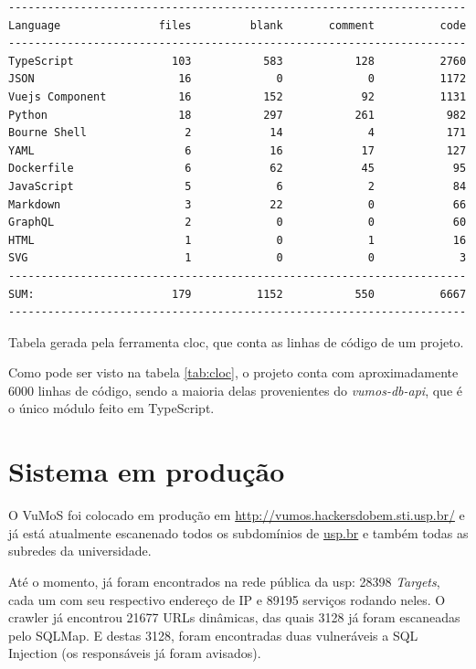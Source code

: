     \clearpage
    \begin{table}[H]
        \begin{verbatim}
----------------------------------------------------------------------
Language               files         blank       comment          code
----------------------------------------------------------------------
TypeScript               103           583           128          2760
JSON                      16             0             0          1172
Vuejs Component           16           152            92          1131
Python                    18           297           261           982
Bourne Shell               2            14             4           171
YAML                       6            16            17           127
Dockerfile                 6            62            45            95
JavaScript                 5             6             2            84
Markdown                   3            22             0            66
GraphQL                    2             0             0            60
HTML                       1             0             1            16
SVG                        1             0             0             3
----------------------------------------------------------------------
SUM:                     179          1152           550          6667
----------------------------------------------------------------------
        \end{verbatim}
        \caption{Tabela gerada pela ferramenta cloc\footnotemark, que conta as linhas de código de um projeto.}
        \label{tab:cloc}
    \end{table}
    
    
    Como pode ser visto na tabela \ref{tab:cloc}, o projeto conta com aproximadamente 6000 linhas de código, sendo a maioria delas provenientes do \textit{vumos-db-api}, que é o único módulo feito em TypeScript.

\section{Sistema em produção}
    O VuMoS foi colocado em produção em \url{http://vumos.hackersdobem.sti.usp.br/} e já está atualmente escanenado todos os subdomínios de \url{usp.br} e também todas as subredes da universidade. 
    
    Até o momento, já foram encontrados na rede pública da usp: 28398 \textit{Targets}, cada um com seu respectivo endereço de IP e 89195 serviços rodando neles. O crawler já encontrou 21677 URLs dinâmicas, das quais 3128 já foram escaneadas pelo SQLMap. E destas 3128, foram encontradas duas vulneráveis a SQL Injection (os responsáveis já foram avisados). 

